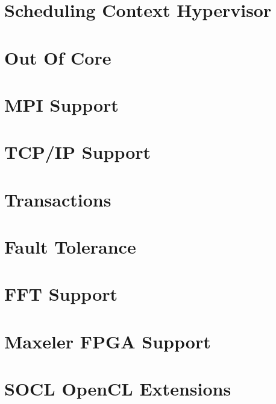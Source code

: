 \chapter{Scheduling Context Hypervisor}
\label{SchedulingContextHypervisor}
\hypertarget{SchedulingContextHypervisor}{}


\chapter{Out Of Core}
\label{OutOfCore}
\hypertarget{OutOfCore}{}


\chapter{MPI Support}
\label{MPISupport}
\hypertarget{MPISupport}{}


\chapter{TCP/IP Support}
\label{TCPIPSupport}
\hypertarget{TCPIPSupport}{}


\chapter{Transactions}
\label{Transactions}
\hypertarget{Transactions}{}


\chapter{Fault Tolerance}
\label{FaultTolerance}
\hypertarget{FaultTolerance}{}


\chapter{FFT Support}
\label{FFTSupport}
\hypertarget{FFTSupport}{}


\chapter{Maxeler FPGA Support}
\label{MaxFPGASupport}
\hypertarget{MaxFPGASupport}{}


\chapter{SOCL OpenCL Extensions}
\label{SOCLOpenclExtensions}
\hypertarget{SOCLOpenclExtensions}{}



